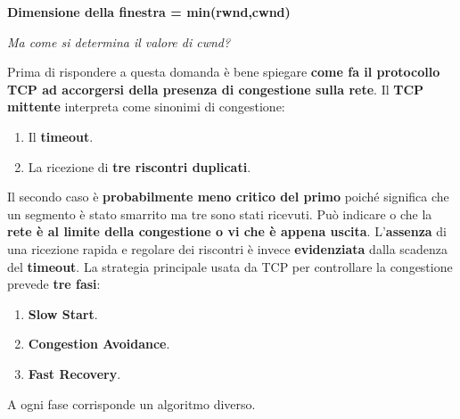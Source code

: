 \documentclass[11pt,a4paper]{article}
\theoremstyle{definition}
\begin{document}
\begin{center}
	\textbf{Dimensione della finestra = min(rwnd,cwnd)}
\end{center}
\begin{flushleft}
	\textit{Ma come si determina il valore di cwnd?}
\end{flushleft}
Prima di rispondere a questa domanda è bene spiegare \textbf{come fa il protocollo TCP ad accorgersi della presenza di congestione sulla rete}.
Il \textbf{TCP mittente} interpreta come sinonimi di congestione:
\begin{enumerate}
	\item Il \textbf{timeout}.
	\item La ricezione di \textbf{tre riscontri duplicati}.
\end{enumerate}
Il secondo caso è \textbf{probabilmente meno critico del primo} poiché significa che un segmento è stato smarrito ma tre sono stati ricevuti. Può indicare o che la \textbf{rete è al limite della congestione o vi che è appena uscita}. L'\textbf{assenza} di una ricezione rapida e regolare dei riscontri è invece \textbf{evidenziata} dalla scadenza del \textbf{timeout}.
\newpage
La strategia principale usata da TCP per controllare la congestione prevede \textbf{tre fasi}:
\begin{enumerate}
	\item \textbf{Slow Start}.
	\item \textbf{Congestion Avoidance}.
	\item \textbf{Fast Recovery}.
\end{enumerate}
A ogni fase corrisponde un algoritmo diverso.
\end{document}

